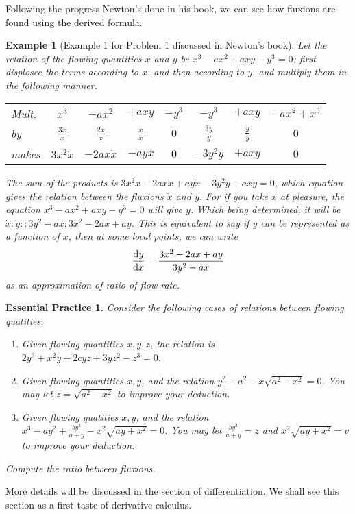 \documentclass[12pt]{article}
\newtheorem*{example}{Example}
\newtheorem{exercise}{Essential Practice}[section]
\begin{document}
    Following the progress Newton's done in his book, we can see how fluxions are found using the derived formula.

    \begin{example}[Example 1 for Problem 1 discussed in Newton's book]
        Let the relation of the flowing quantities $x$ and $y$ be $x^3-ax^2+axy-y^3=0$; first displosee the terms according to $x$, and then according to $y$, and multiply them in the following manner.
        \begin{center}
            \begin{tabular}{l c c c c | c c c}
                Mult.&$x^3$&$-ax^2$&$+axy$&$-y^3$&$-y^3$&$+axy$&$-ax^2+x^3$\\
                by&$\frac{3\dot{x}}{x}$&$\frac{2\dot{x}}{x}$&$\frac{\dot{x}}{x}$&$0$&$\frac{3\dot{y}}{y}$&$\frac{\dot{y}}{y}$&$0$\\
                \hline
                makes&$3x^2\dot{x}$&$-2ax\dot{x}$&$+ay\dot{x}$&$0$&$-3y^2\dot{y}$&$+ax\dot{y}$&$0$\\
            \end{tabular}
        \end{center}
        The sum of the products is $3x^2\dot{x}-2ax\dot{x}+ay\dot{x}-3y^2\dot{y}+ax\dot{y}=0$, which equation gives the relation between the fluxions $\dot{x}$ and $\dot{y}$. For if you take $x$ at pleasure, the equation $x^3-ax^2+axy-y^3=0$ will give $y$. Which being determined, it will be $\dot{x}:\dot{y}::3y^2-ax:3x^2-2ax+ay$. This is equivalent to say if $y$ can be represented as a function of $x$, then at some local points, we can write \[\derivative{y}{x}=\frac{3x^2-2ax+ay}{3y^2-ax}\] as an approximation of ratio of flow rate.
    \end{example}

    \begin{exercise}
        Consider the following cases of relations between flowing quatities. \begin{enumerate}
            \item Given flowing quantities $x,y,z$, the relation is $2y^3+x^2y-2cyz+3yz^2-z^3=0$.
            \item Given flowing quantities $x,y$, and the relation $y^2-a^2-x\sqrt{a^2-x^2}=0$. You may let $z=\sqrt{a^2-x^2}$ to improve your deduction.
            \item Given flowing quatities $x,y$, and the relation $x^3-ay^2+\frac{by^3}{a+y}-x^2\sqrt{ay+x^2}=0$. You may let $\frac{by^3}{a+y}=z$ and $x^2\sqrt{ay+x^2}=v$ to improve your deduction.
        \end{enumerate}
        Compute the ratio between fluxions.
    \end{exercise}

    More details will be discussed in the section of differentiation. We shall see this section as a first taste of derivative calculus.
\end{document}
